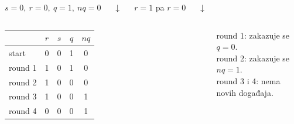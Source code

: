\begin{frame}[label=07-s029]
\begin{columns}[c,onlytextwidth]
\centering
{}\centering
$s=0,\ r=0,\ q=1,\ nq=0$\par\vspace{2mm}
\textcolor{DEcrvena}{$\downarrow$}\par
$r=1$ pa $r=0$\par
\textcolor{DEcrvena}{$\downarrow$}
\end{columns}
\par\vspace{3mm}
\begin{columns}[T,onlytextwidth]
\fontsize{10}{13}\selectfont\centering
\begin{tabular}{@{}lcccc@{}}\toprule
 & $r$ & $s$ & $q$ & $nq$\\\midrule
start & 0&0&1&0\\
round 1 &1&0&1&0\\
round 2 &1&0&0&0\\
round 3 &1&0&0&1\\
round 4 &0&0&0&1\\\bottomrule
\end{tabular}\par\vspace{2mm}\raggedright
round 1: zakazuje se $q=0$.\\
round 2: zakazuje se $nq=1$.\\
round 3 i 4: nema novih događaja.
\end{columns}
\end{frame}
